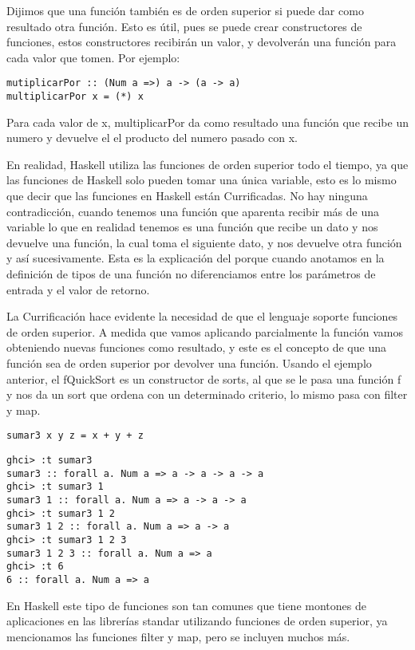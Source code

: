 Dijimos que una función también es de orden superior si puede dar como resultado otra función. Esto es útil, pues se puede crear constructores de funciones, estos constructores recibirán un valor, y devolverán una función para cada valor que tomen. Por ejemplo:

\begin{lstlisting}
mutiplicarPor :: (Num a =>) a -> (a -> a)
multiplicarPor x = (*) x
\end{lstlisting}

Para cada valor de x, multiplicarPor da como resultado una función que recibe un numero y devuelve el el producto del numero pasado con x.


En realidad, Haskell utiliza las funciones de orden superior todo el tiempo, ya que las funciones de Haskell solo pueden tomar una única variable, esto es lo mismo que decir que las funciones en Haskell están Currificadas. No hay ninguna contradicción, cuando tenemos una función que aparenta recibir más de una variable lo que en realidad tenemos es una función que recibe un dato y nos devuelve una función, la cual toma el siguiente dato, y nos devuelve otra función y así sucesivamente. Esta es la explicación del porque cuando anotamos en la definición de tipos de una función no diferenciamos entre los parámetros de entrada y el valor de retorno.

La Currificación hace evidente la necesidad de que el lenguaje soporte funciones de orden superior. A medida que vamos aplicando parcialmente la función vamos obteniendo nuevas funciones como resultado, y este es el concepto de que una función sea de orden superior por devolver una función. Usando el ejemplo anterior, el fQuickSort es un constructor de sorts, al que se le pasa una función f y nos da un sort que ordena con un determinado criterio, lo mismo pasa con filter y map.

\begin{lstlisting}
sumar3 x y z = x + y + z
\end{lstlisting}

\begin{lstlisting}
ghci> :t sumar3
sumar3 :: forall a. Num a => a -> a -> a -> a
ghci> :t sumar3 1
sumar3 1 :: forall a. Num a => a -> a -> a
ghci> :t sumar3 1 2
sumar3 1 2 :: forall a. Num a => a -> a
ghci> :t sumar3 1 2 3
sumar3 1 2 3 :: forall a. Num a => a
ghci> :t 6
6 :: forall a. Num a => a
\end{lstlisting}

En Haskell este tipo de funciones son tan comunes que tiene montones de aplicaciones en las librerías standar utilizando funciones de orden superior, ya mencionamos las funciones  filter y map, pero se incluyen muchos más.

